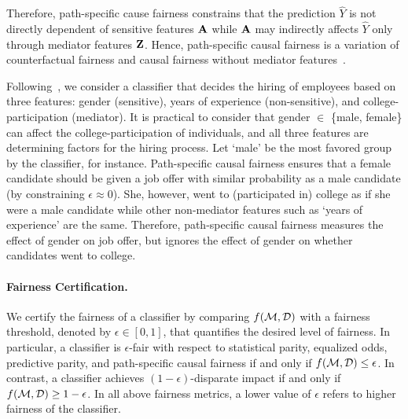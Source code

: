 Therefore, path-specific cause fairness constrains that the prediction $ \hat{Y} $ is not directly dependent of sensitive features $ \mathbf{A} $ while $ \mathbf{A} $ may indirectly affects $ \hat{Y} $ only through mediator features $ \mathbf{Z} $. Hence, path-specific causal fairness is a variation of counterfactual fairness and causal fairness without mediator features~\cite{bastani2019probabilistic}. 




\begin{example}
	\normalfont
	Following~\cite{bastani2019probabilistic}, we consider a classifier that decides the hiring of employees based on three features: gender (sensitive), years of experience (non-sensitive), and college-participation (mediator). It is practical to consider that gender $ \in $ \{male, female\} can affect the college-participation of individuals, and all three features are determining factors for the hiring process. Let `male' be the most favored group by the classifier, for instance. Path-specific causal fairness ensures that a female candidate should be given a job offer with similar probability as a male candidate (by constraining $ \epsilon \approx 0 $). She,  however,  went to (participated in) college as if she were a male candidate while other non-mediator features such as  `years of experience' are the same.  Therefore, path-specific causal fairness measures the effect of gender on job offer, but ignores the effect of gender on whether candidates went to college.
\end{example}	



\paragraph{Fairness Certification.} We certify the fairness of a classifier by comparing $ f(\mathcal{M}, \mathcal{D}) $ with a fairness threshold, denoted by $ \epsilon \in [0,1] $, that quantifies the desired level of fairness. In particular, a classifier is $ \epsilon $-fair with respect to statistical parity, equalized odds, predictive parity, and path-specific causal fairness if and only if $ f(\mathcal{M}, \mathcal{D}) \le \epsilon $. In contrast, a classifier achieves $(1 - \epsilon)$-disparate impact  if and only if $ f(\mathcal{M}, \mathcal{D}) \ge 1 - \epsilon $. In all above fairness metrics, a lower value of $ \epsilon $ refers to higher fairness of the classifier.




